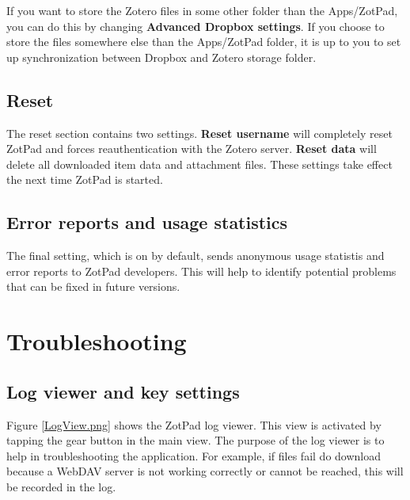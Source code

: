 \documentclass[oneside, openany, 12pt]{tufte-book}
\newcommand{\ipadfootnote}[1]{}
\newcommand{\ipadfootnote}[1]{\footnote{#1}}
\begin{document}
If you want to store the Zotero files in some other folder than the Apps/ZotPad, you can do this by changing \textbf{Advanced Dropbox settings}. If you choose to store the files somewhere else than the Apps/ZotPad folder, it is up to you to set up synchronization between Dropbox and Zotero storage folder\ipadfootnote{Although it is possible to put the entire Zotero data directory inside Dropbox, this is not recommended. Doing so will cause your database and its journal file to be synchronized to Dropbox cloud. This will create a large amount of unnecessary network traffic. Additionally, if you use Zotero on two different computers with this setup, there is a high risk of corrupting your Zotero database.}.

\section{Reset}

The reset section contains two settings. \textbf{Reset username} will completely reset ZotPad and forces reauthentication with the Zotero server. \textbf{Reset data} will delete all downloaded item data and attachment files. These settings take effect the next time ZotPad is started.

\section{Error reports and usage statistics}

The final setting, which is on by default, sends anonymous usage statistis and error reports to ZotPad developers. This will help to identify potential problems that can be fixed in future versions.

\chapter{Troubleshooting}

\section{Log viewer and key settings}

Figure \ref{LogView.png} shows the ZotPad log viewer. This view is activated by tapping the gear button in the main view. The purpose of the log viewer is to help in troubleshooting the application. For example, if files fail do download because a WebDAV server is not working correctly or cannot be reached, this will be recorded in the log.
\end{document}
